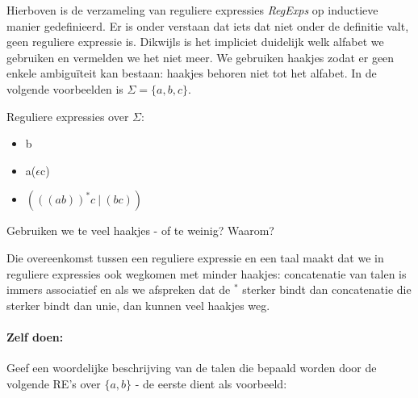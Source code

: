 Hierboven is de verzameling van reguliere expressies {\em RegExps}
op inductieve manier gedefinieerd. Er is onder verstaan dat iets dat
niet onder de definitie valt, geen reguliere expressie is. Dikwijls is
het impliciet duidelijk welk alfabet we gebruiken en vermelden we het
niet meer. We gebruiken haakjes zodat er geen enkele ambigu\"{i}teit kan
bestaan: haakjes behoren niet tot het alfabet. In de volgende
voorbeelden is $\Sigma = \{a,b,c\}$.


\begin{vb}
Reguliere expressies over $\Sigma$:
\begin{itemize}
\item b
\item a($\epsilon$c)
\item $(((ab))^*c~|~(bc))$
\end{itemize}
\end{vb}

Gebruiken we te veel haakjes - of te weinig? Waarom?




Die overeenkomst tussen een reguliere expressie en een taal maakt dat
we in reguliere expressies ook wegkomen met minder haakjes:
concatenatie van talen is immers associatief en als we afspreken dat
de $^*$ sterker bindt dan concatenatie die sterker bindt dan unie, dan
kunnen veel haakjes weg.

\paragraph{Zelf doen:}
Geef een woordelijke beschrijving van de talen die bepaald worden door
de volgende RE's over $\{a,b\}$ - de eerste dient als voorbeeld:

